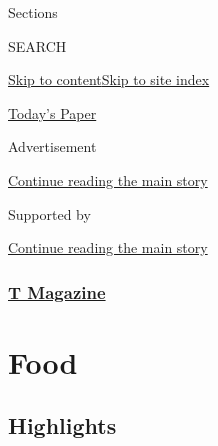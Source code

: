 Sections

SEARCH

\protect\hyperlink{site-content}{Skip to
content}\protect\hyperlink{site-index}{Skip to site index}

\href{https://myaccount.nytimes3xbfgragh.onion/auth/login?response_type=cookie\&client_id=vi}{}

\href{https://www.nytimes3xbfgragh.onion/section/todayspaper}{Today's
Paper}

Advertisement

\protect\hyperlink{after-top}{Continue reading the main story}

Supported by

\protect\hyperlink{after-sponsor}{Continue reading the main story}

\hypertarget{t-magazine}{%
\subsubsection{\texorpdfstring{\href{/section/t-magazine}{T
Magazine}}{T Magazine}}\label{t-magazine}}

\hypertarget{food}{%
\section{Food}\label{food}}

\hypertarget{highlights}{%
\subsection{Highlights}\label{highlights}}

